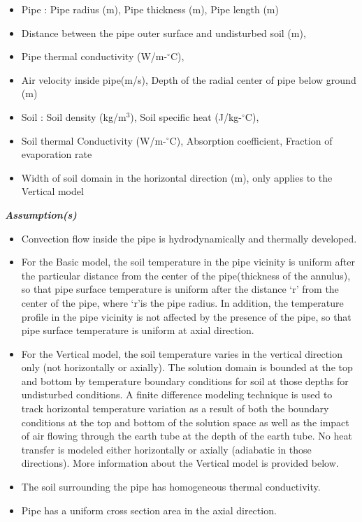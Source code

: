 \begin{itemize}
\tightlist
\item Pipe : Pipe radius (m), Pipe thickness (m), Pipe length (m)
\item Distance between the pipe outer surface and undisturbed soil (m),
\item Pipe thermal conductivity (W/m-\(^{\circ}\)C),
\item Air velocity inside pipe(m/s), Depth of the radial center of pipe below ground (m)
\item Soil : Soil density (kg/m\(^{3}\)), Soil specific heat (J/kg-\(^{\circ}\)C),
\item Soil thermal Conductivity (W/m-\(^{\circ}\)C), Absorption coefficient, Fraction of evaporation rate
\item Width of soil domain in the horizontal direction (m), only applies to the Vertical model
\end{itemize}

\emph{\textbf{Assumption(s)}}

\begin{itemize}
\item
  Convection flow inside the pipe is hydrodynamically and thermally developed.
\item
  For the Basic model, the soil temperature in the pipe vicinity is uniform after the particular distance from the center of the pipe(thickness of the annulus), so that pipe surface temperature is uniform after the distance `r' from the center of the pipe, where `r'is the pipe radius.  In addition, the temperature profile in the pipe vicinity is not affected by the presence of the pipe, so that pipe surface temperature is uniform at axial direction.
\item
  For the Vertical model, the soil temperature varies in the vertical direction only (not horizontally or axially). The solution domain is bounded at the top and bottom by temperature boundary conditions for soil at those depths for undisturbed conditions. A finite difference modeling technique is used to track horizontal temperature variation as a result of both the boundary conditions at the top and bottom of the solution space as well as the impact of air flowing through the earth tube at the depth of the earth tube.  No heat transfer is modeled either horizontally or axially (adiabatic in those directions).  More information about the Vertical model is provided below.
\item
  The soil surrounding the pipe has homogeneous thermal conductivity.
\item
  Pipe has a uniform cross section area in the axial direction.
\end{itemize}

